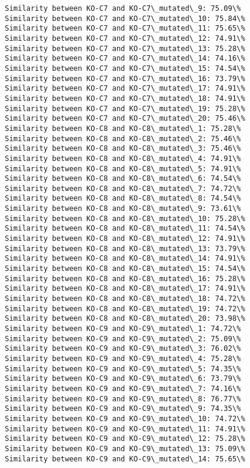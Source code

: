 \documentclass[11pt]{article}
\begin{document}
\begin{Verbatim}[commandchars=\\\{\}]
Similarity between KO-C7 and KO-C7\_mutated\_9: 75.09\%
Similarity between KO-C7 and KO-C7\_mutated\_10: 75.84\%
Similarity between KO-C7 and KO-C7\_mutated\_11: 75.65\%
Similarity between KO-C7 and KO-C7\_mutated\_12: 74.91\%
Similarity between KO-C7 and KO-C7\_mutated\_13: 75.28\%
Similarity between KO-C7 and KO-C7\_mutated\_14: 74.16\%
Similarity between KO-C7 and KO-C7\_mutated\_15: 74.54\%
Similarity between KO-C7 and KO-C7\_mutated\_16: 73.79\%
Similarity between KO-C7 and KO-C7\_mutated\_17: 74.91\%
Similarity between KO-C7 and KO-C7\_mutated\_18: 74.91\%
Similarity between KO-C7 and KO-C7\_mutated\_19: 75.28\%
Similarity between KO-C7 and KO-C7\_mutated\_20: 75.46\%
Similarity between KO-C8 and KO-C8\_mutated\_1: 75.28\%
Similarity between KO-C8 and KO-C8\_mutated\_2: 75.46\%
Similarity between KO-C8 and KO-C8\_mutated\_3: 75.46\%
Similarity between KO-C8 and KO-C8\_mutated\_4: 74.91\%
Similarity between KO-C8 and KO-C8\_mutated\_5: 74.91\%
Similarity between KO-C8 and KO-C8\_mutated\_6: 74.54\%
Similarity between KO-C8 and KO-C8\_mutated\_7: 74.72\%
Similarity between KO-C8 and KO-C8\_mutated\_8: 74.54\%
Similarity between KO-C8 and KO-C8\_mutated\_9: 73.61\%
Similarity between KO-C8 and KO-C8\_mutated\_10: 75.28\%
Similarity between KO-C8 and KO-C8\_mutated\_11: 74.54\%
Similarity between KO-C8 and KO-C8\_mutated\_12: 74.91\%
Similarity between KO-C8 and KO-C8\_mutated\_13: 73.79\%
Similarity between KO-C8 and KO-C8\_mutated\_14: 74.91\%
Similarity between KO-C8 and KO-C8\_mutated\_15: 74.54\%
Similarity between KO-C8 and KO-C8\_mutated\_16: 75.28\%
Similarity between KO-C8 and KO-C8\_mutated\_17: 74.91\%
Similarity between KO-C8 and KO-C8\_mutated\_18: 74.72\%
Similarity between KO-C8 and KO-C8\_mutated\_19: 74.72\%
Similarity between KO-C8 and KO-C8\_mutated\_20: 73.98\%
Similarity between KO-C9 and KO-C9\_mutated\_1: 74.72\%
Similarity between KO-C9 and KO-C9\_mutated\_2: 75.09\%
Similarity between KO-C9 and KO-C9\_mutated\_3: 76.02\%
Similarity between KO-C9 and KO-C9\_mutated\_4: 75.28\%
Similarity between KO-C9 and KO-C9\_mutated\_5: 74.35\%
Similarity between KO-C9 and KO-C9\_mutated\_6: 73.79\%
Similarity between KO-C9 and KO-C9\_mutated\_7: 74.16\%
Similarity between KO-C9 and KO-C9\_mutated\_8: 76.77\%
Similarity between KO-C9 and KO-C9\_mutated\_9: 74.35\%
Similarity between KO-C9 and KO-C9\_mutated\_10: 74.72\%
Similarity between KO-C9 and KO-C9\_mutated\_11: 74.91\%
Similarity between KO-C9 and KO-C9\_mutated\_12: 75.28\%
Similarity between KO-C9 and KO-C9\_mutated\_13: 75.09\%
Similarity between KO-C9 and KO-C9\_mutated\_14: 75.65\%

\end{Verbatim}
\end{document}
